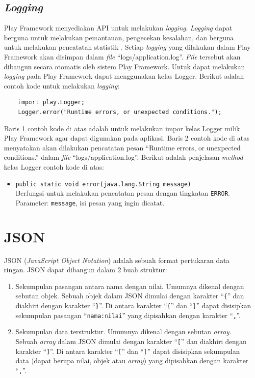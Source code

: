 \subsection{\textit{Logging}}
\label{sec:logger}
Play Framework menyediakan API untuk melakukan \textit{logging}. \textit{Logging} dapat berguna untuk melakukan pemantauan, pengecekan kesalahan, dan berguna untuk melakukan pencatatan statistik \cite{playframeworkweb}. Setiap \textit{logging} yang dilakukan dalam Play Framework akan disimpan dalam \textit{file} ``logs/application.log''. \textit{File} tersebut akan dibangun secara otomatis oleh sistem Play Framework. Untuk dapat melakukan \textit{logging} pada Play Framework dapat menggunakan kelas Logger. Berikut adalah contoh kode untuk melakukan \textit{logging}:
\begin{lstlisting}
	import play.Logger;
	Logger.error("Runtime errors, or unexpected conditions.");
\end{lstlisting}

Baris 1 contoh kode di atas adalah untuk melakukan impor kelas Logger milik Play Framework agar dapat digunakan pada aplikasi. Baris 2 contoh kode di atas menyatakan akan dilakukan pencatatan pesan ``Runtime errors, or unexpected conditions.'' dalam \textit{file} ``logs/application.log''. Berikut adalah penjelasan \textit{method} kelas Logger contoh kode di atas:
\begin{itemize}
	\item \texttt{public static void error(java.lang.String message)}\\
	Berfungsi untuk melakukan pencatatan pesan dengan tingkatan \texttt{ERROR}.\\
	Parameter: \texttt{message}, isi pesan yang ingin dicatat.
\end{itemize}



\section{JSON}
\label{sec:json}
JSON (\textit{JavaScript Object Notation}) adalah sebuah format pertukaran data ringan\cite{json}. JSON dapat dibangun dalam 2 buah struktur:
\begin{enumerate}
	\item Sekumpulan pasangan antara nama dengan nilai. Umumnya dikenal dengan sebutan objek. Sebuah objek dalam JSON dimulai dengan karakter ``\texttt{\{}'' dan diakhiri dengan karakter ``\texttt{\}}''. Di antara karakter ``\texttt{\{}'' dan ``\texttt{\}}'' dapat disisipkan sekumpulan pasangan ``\texttt{nama:nilai}'' yang dipisahkan dengan karakter ``\texttt{,}''.
	\item Sekumpulan data terstruktur. Umumnya dikenal dengan sebutan \textit{array}. Sebuah \textit{array} dalam JSON dimulai dengan karakter ``\texttt{[}'' dan diakhiri dengan karakter ``\texttt{]}''. Di antara karakter ``\texttt{[}'' dan ``\texttt{]}'' dapat disisipkan sekumpulan data (dapat berupa nilai, objek atau \textit{array}) yang dipisahkan dengan karakter ``\texttt{,}''.
\end{enumerate}

